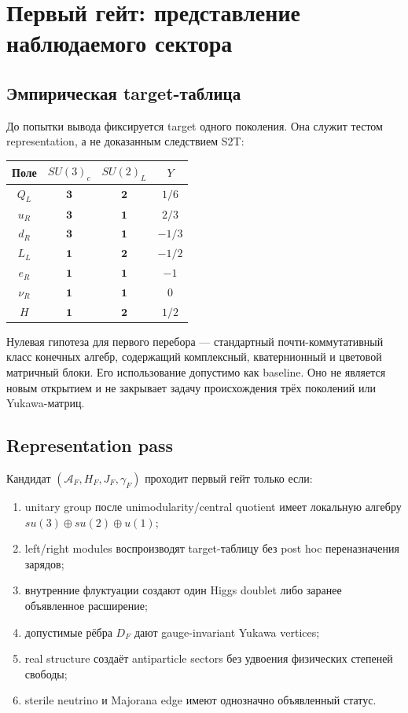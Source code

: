 \chapter{Первый гейт: представление наблюдаемого сектора}

\section{Эмпирическая target-таблица}

До попытки вывода фиксируется target одного поколения. Она служит тестом
representation, а не доказанным следствием S2T:
\begin{center}
\begin{tabular}{cccc}
\toprule
Поле & \(SU(3)_c\) & \(SU(2)_L\) & \(Y\) \\
\midrule
\(Q_L\) & \(\mathbf 3\) & \(\mathbf 2\) & \(1/6\) \\
\(u_R\) & \(\mathbf 3\) & \(\mathbf 1\) & \(2/3\) \\
\(d_R\) & \(\mathbf 3\) & \(\mathbf 1\) & \(-1/3\) \\
\(L_L\) & \(\mathbf 1\) & \(\mathbf 2\) & \(-1/2\) \\
\(e_R\) & \(\mathbf 1\) & \(\mathbf 1\) & \(-1\) \\
\(\nu_R\) & \(\mathbf 1\) & \(\mathbf 1\) & \(0\) \\
\(H\) & \(\mathbf 1\) & \(\mathbf 2\) & \(1/2\) \\
\bottomrule
\end{tabular}
\end{center}

Нулевая гипотеза для первого перебора --- стандартный почти-коммутативный
класс конечных алгебр, содержащий комплексный, кватернионный и цветовой
матричный блоки. Его использование допустимо как baseline. Оно не является
новым открытием и не закрывает задачу происхождения трёх поколений или
Yukawa-матриц.

\section{Representation pass}

Кандидат \((\mathcal A_F,H_F,J_F,\gamma_F)\) проходит первый гейт только
если:
\begin{enumerate}
 \item unitary group после unimodularity/central quotient имеет локальную
 алгебру \(su(3)\oplus su(2)\oplus u(1)\);
 \item left/right modules воспроизводят target-таблицу без post hoc
 переназначения зарядов;
 \item внутренние флуктуации создают один Higgs doublet либо заранее
 объявленное расширение;
 \item допустимые рёбра \(D_F\) дают gauge-invariant Yukawa vertices;
 \item real structure создаёт antiparticle sectors без удвоения физических
 степеней свободы;
 \item sterile neutrino и Majorana edge имеют однозначно объявленный статус.
\end{enumerate}

